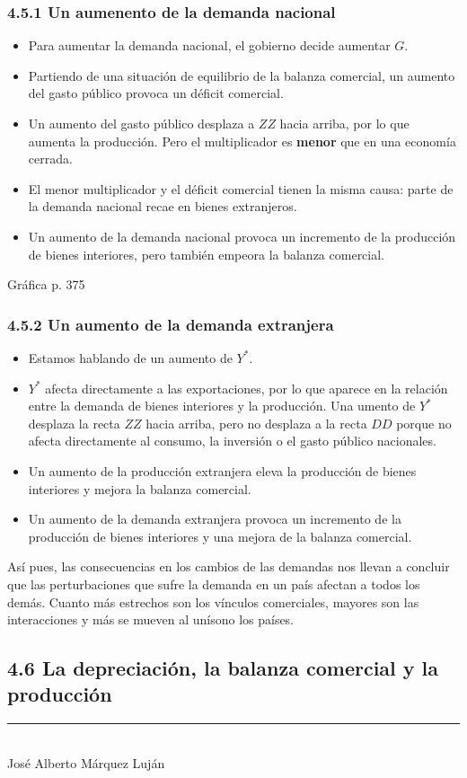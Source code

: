 \documentclass[10pt, landscape]{article}
\begin{document}
\begin{multicols*}{3}
\subsubsection{4.5.1 Un aumenento de la demanda nacional}
\begin{itemize}
    \item Para aumentar la demanda nacional, el gobierno decide aumentar $G$.
    \item Partiendo de una situación de equilibrio de la balanza comercial, un aumento del gasto público provoca un déficit comercial.
    \item Un aumento del gasto público desplaza a $ZZ$ hacia arriba, por lo que aumenta la producción. Pero el multiplicador es \textbf{menor} que en una economía cerrada.
    \item El menor multiplicador y el déficit comercial tienen la misma causa: parte de la demanda nacional recae en bienes extranjeros.
    \item Un aumento de la demanda nacional provoca un incremento de la producción de bienes interiores, pero también empeora la balanza comercial.
\end{itemize}

Gráfica p. 375

\subsubsection{4.5.2 Un aumento de la demanda extranjera}
\begin{itemize}    
    \item Estamos hablando de un aumento de $Y^*$.
    \item $Y^*$ afecta directamente a las exportaciones, por lo que aparece en la relación entre la demanda de bienes interiores y la producción. Una umento de $Y^*$ desplaza la recta $ZZ$ hacia arriba, pero no desplaza a la recta $DD$ porque no afecta directamente al consumo, la inversión o el gasto público nacionales. 
    \item Un aumento de la producción extranjera eleva la producción de bienes interiores y  mejora la balanza comercial.
    \item Un aumento de la demanda extranjera provoca un incremento de la producción de bienes interiores y una mejora de la balanza comercial.
\end{itemize}

Así pues, las consecuencias en los cambios de las demandas nos llevan a concluir que las perturbaciones que sufre la demanda en un país afectan a todos los demás. Cuanto más estrechos son los vínculos comerciales, mayores son las interacciones y más se mueven al unísono los países.

\subsection{4.6 La depreciación, la balanza comercial y la producción}


\vfill
\begin{flushright}
    \rule{0.65\linewidth}{0.1pt} \\
    José Alberto Márquez Luján
\end{flushright}

\end{multicols*}
\end{document}
